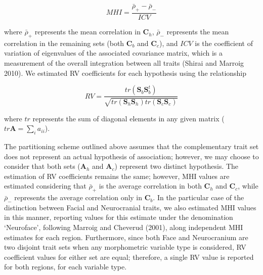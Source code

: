 \documentclass[12pt,]{article}
\begin{document}
\begin{equation}
MHI = \frac {\bar{\rho}_{+} - \bar{\rho}_{-}} {ICV}
\label{eq:mi}
\end{equation}

where $\bar{\rho}_{+}$ represents the mean correlation in
$\mathbf{C}_h$, $\bar{\rho}_{-}$ represents the mean correlation in the
remaining sets (both $\mathbf{C}_b$ and $\mathbf{C}_c$), and $ICV$ is
the coefficient of variation of eigenvalues of the associated covariance
matrix, which is a measurement of the overall integration between all
traits (Shirai and Marroig 2010). We estimated RV coefficients for each
hypothesis using the relationship

\begin{equation}
RV = \frac{tr(\mathbf{S}_{b}\mathbf{S}^t_{b})}{\sqrt{tr(\mathbf{S}_h \mathbf{S}_h)tr(\mathbf{S}_c \mathbf{S}_c)}}
\label{eq:rv}
\end{equation}

where $tr$ represents the sum of diagonal elements in any given matrix
($tr \mathbf{A} = \sum_i a_{ii}$).

The partitioning scheme outlined above assumes that the complementary
trait set does not represent an actual hypothesis of association;
however, we may choose to consider that both sets ($\mathbf{A}_h$ and
$\mathbf{A}_c$) represent two distinct hypothesis. The estimation of RV
coefficients remains the same; however, MHI values are estimated
considering that $\bar{\rho}_{+}$ is the average correlation in both
$\mathbf{C}_h$ and $\mathbf{C}_c$, while $\bar{\rho}_{-}$ represents the
average correlation only in $\mathbf{C}_b$. In the particular case of
the distinction between Facial and Neurocranial traits, we also
estimated MHI values in this manner, reporting values for this estimate
under the denomination `Neuroface', following Marroig and Cheverud
(2001), along independent MHI estimates for each region. Furthermore,
since both Face and Neurocranium are two disjoint trait sets when any
morphometric variable type is considered, RV coefficient values for
either set are equal; therefore, a single RV value is reported for both
regions, for each variable type.
\end{document}
